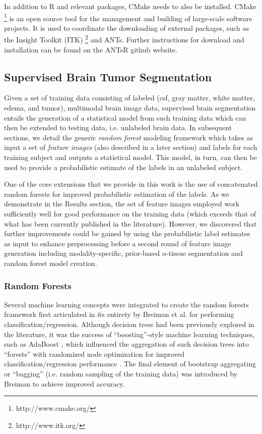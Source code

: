 \documentclass[final,5p,times,twocolumn]{elsarticle}
\begin{document}
In addition to R and relevant packages, CMake needs to also be
installed.  CMake%
\footnote{
http://www.cmake.org/
}
is an open source tool for the management and building of 
large-scale software projects.  It is used
to coordinate the downloading of external packages,
such as the Insight Toolkit (ITK)%
\footnote{
http://www.itk.org/
}
and ANTs.  Further instructions for download and
installation can be found on the ANTsR github website.

\subsection{Supervised Brain Tumor Segmentation}

Given a set of training data consisting of 
labeled (csf, gray matter, white matter, edema, and tumor),
multimodal brain image data, 
supervised brain segmentation entails the generation of a 
statistical model from such training data which can
then be extended to testing data, i.e. unlabeled 
brain data.  In subsequent sections, we detail the generic
{\it random forest} modeling framework which takes as input
a set of {\it feature images} (also described in a later section)
and labels for each training subject 
and outputs a statistical model.  This model, in turn, can then
be used to provide a probabilistic estimate of the labels in an
unlabeled subject. 

One of the core extensions that we provide in this work is
the use of concatenated random forests for improved probabilistic estimation
of the labels.
As we demonstrate in the Results section, the set of feature
images employed work sufficiently well for good performance
on the training data (which exceeds that of what has been
currently published in the literature).  However, we discovered
that further improvements could be gained by using the probabilistic 
label estimates as input to enhance preprocessing before a 
second round of feature image generation including 
modality-specific, prior-based $n$-tissue segmentation and 
random forest model creation. 

\subsubsection{Random Forests}

Several machine learning concepts were integrated to create 
the random forests framework first articulated in its entirety by Breiman
et al. \cite{breiman2001} for performing classification/regression.  
Although decision trees had been previously explored in the literature, 
it was the success of ``boosting''-style machine learning 
techniques, such as AdaBoost \cite{schapire1990,freund1997}, which influenced 
the aggregation of such decision trees into ``forests'' 
with randomized node optimization for improved
classification/regression performance \cite{ho1995,amit1997}.
The final element of bootstrap aggregating or ``bagging'' (i.e.
random sampling of the training data) was
introduced by Breiman \cite{breiman1996} to achieve improved
accuracy.  
\end{document}
